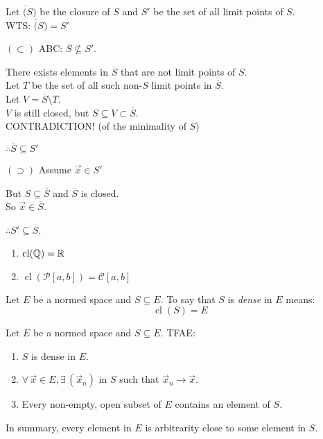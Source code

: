 \documentclass[letterpaper,12pt,fleqn]{article}
\newcommand{\bcl}[1]{\overline{#1}}
\newcommand{\vx}{\vec{x}}
\renewcommand{\mp}{\mathcal{P}}
\newcommand{\mc}{\mathcal{C}}
\DeclareMathOperator{\cl}{cl}
\begin{document}
\begin{theproof}
  Let $\bcl(S)$ be the closure of $S$ and $S'$ be the set of all limit points
  of $S$. \\
  WTS: $\bcl(S)=S'$
  
  \begin{description}
  \item $(\subset)$ ABC: $\bcl{S}\not\subseteq S'$.

    There exists elements in $\bcl{S}$ that are not limit points of $S$. \\
    Let $T$ be the set of all such non-$S$ limit points in $\bcl{S}$. \\
    Let $V=\bcl{S}\setminus T$. \\
    $V$ is still closed, but $S\subseteq V\subset\bcl{S}$. \\
    CONTRADICTION! (of the minimality of $\bcl{S}$)

    $\therefore\bcl{S}\subseteq S'$

  \item $(\supset)$ Assume $\vx\in S'$

    But $S\subseteq\bcl{S}$ and $\bcl{S}$ is closed. \\
    So $\vx\in\bcl{S}$.

    $\therefore S'\subseteq\bcl{S}$.
  \end{description}
\end{theproof}

\begin{examples}
  \listbreak
  \begin{enumerate}
  \item $\cl(\Q)=\R$
  \item $\cl(\mp[a,b])=\mc[a,b]$
  \end{enumerate}
\end{examples}

\begin{definition}[Dense]
  Let $E$ be a normed space and $S\subseteq E$. To say that $S$ is
  \emph{dense} in $E$ means:
  \[\cl(S)=E\]
\end{definition}

\begin{theorem}
  Let $E$ be a normed space and $S\subseteq E$. TFAE:
  \begin{enumerate}
  \item $S$ is dense in $E$.
  \item $\forall\,\vx\in E,\exists\,(\vx_n)$ in $S$ such that $\vx_n\to\vx$.
  \item Every non-empty, open subset of $E$ contains an element of $S$.
  \end{enumerate}
  In summary, every element in $E$ is arbitrarity close to some element in $S$.
\end{theorem}
\end{document}
